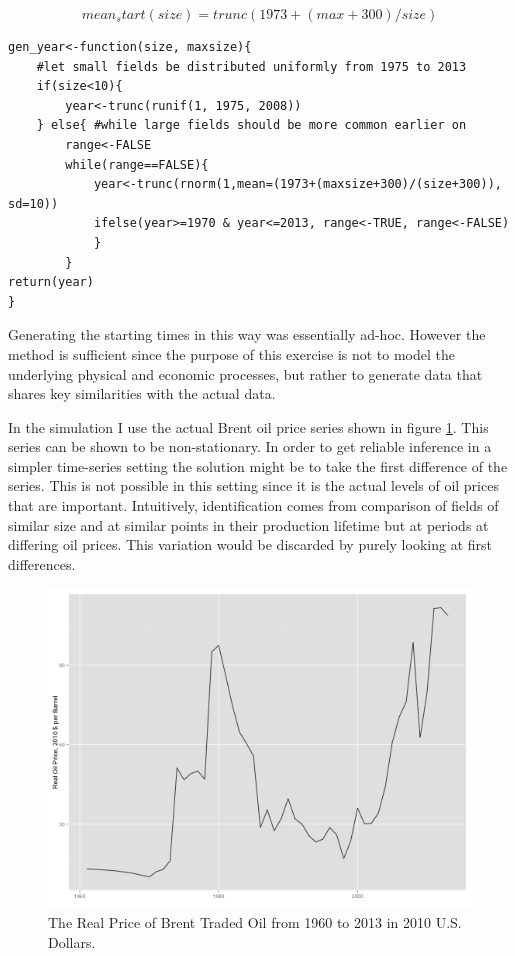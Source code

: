 \documentclass[12pt]{article}
\begin{document}
\begin{equation}
mean_start(size) = trunc(1973 + (max + 300)/size)
\end{equation}

\begin{verbatim}
gen_year<-function(size, maxsize){
	#let small fields be distributed uniformly from 1975 to 2013
	if(size<10){
		year<-trunc(runif(1, 1975, 2008))	
	} else{	#while large fields should be more common earlier on
		range<-FALSE
		while(range==FALSE){
			year<-trunc(rnorm(1,mean=(1973+(maxsize+300)/(size+300)), sd=10))
			ifelse(year>=1970 & year<=2013, range<-TRUE, range<-FALSE)
			}	
		}
return(year)	
}
\end{verbatim}

Generating the starting times in this way was essentially ad-hoc.  However the method is sufficient since the purpose of this exercise is not to model the underlying physical and economic processes, but rather to generate data that shares key similarities with the actual data.

In the simulation I use the actual Brent oil price series shown in figure \ref{oil_price_series}.  This series can be shown to be non-stationary.  In order to get reliable inference in a simpler time-series setting the solution might be to take the first difference of the series.  This is not possible in this setting since it is the actual levels of oil prices that are important.  Intuitively, identification comes from comparison of fields of similar size and at similar points in their production lifetime but at periods at differing oil prices.  This variation would be discarded by purely looking at first differences.

\begin{figure}
	\includegraphics[width=1\textwidth]{figures/oil_price_series.png}
	\caption{The Real Price of Brent Traded Oil from 1960 to 2013 in 2010 U.S. Dollars.}
	\label{oil_price_series}	
	\end{figure}
\end{document}
